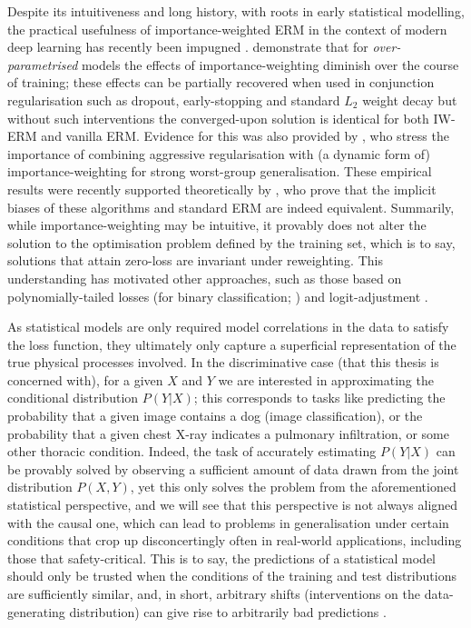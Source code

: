 Despite its intuitiveness and long history, with roots in early statistical modelling, the
practical usefulness of importance-weighted \ac{ERM} in the context of modern deep learning has recently
been impugned \citep{byrd2019effect, zhai2022understanding}.
%
\cite{byrd2019effect} demonstrate that for \emph{over-parametrised} models the effects of
importance-weighting diminish over the course of training; these effects can be partially recovered
when used in conjunction regularisation such as dropout, early-stopping and standard \(L_2\) weight
decay but without such interventions the converged-upon solution is identical for both
\ac{IW}-\ac{ERM} and
vanilla \ac{ERM}. 
%
Evidence for this was also provided by \cite{sagawa2019distributionally}, who stress the importance
of combining aggressive regularisation with (a dynamic form of) importance-weighting for strong
worst-group generalisation.
%
These empirical results were recently supported theoretically by \cite{zhai2022understanding}, who
prove that the implicit biases of these algorithms and standard \ac{ERM} are indeed equivalent.
%
Summarily, while importance-weighting may be intuitive, it provably does not alter the solution to
the optimisation problem defined by the training set, which is to say, solutions that attain
zero-loss are invariant under reweighting.
%
This understanding has motivated other approaches, such as those based on polynomially-tailed
losses (for binary classification; \cite{wang2021importance}) and logit-adjustment
\citep{menon2020long}.
%

As statistical models are only required model correlations in the data to satisfy the loss
function, they ultimately only capture a superficial representation of the true physical processes
involved.
%
In the discriminative case (that this thesis is concerned with), for a given \( X \) and \( Y \) we
are interested in approximating the conditional distribution \( P(Y|X) \); this  corresponds to
tasks like predicting the probability that a given image contains a dog (image classification), or
the probability that a given chest X-ray indicates a pulmonary infiltration, or some other thoracic
condition.
%
Indeed, the task of accurately estimating \( P(Y | X) \) can be provably solved by observing a
sufficient amount of \iid{} data drawn from the joint distribution \( P(X,Y) \), yet this only
solves the problem from the aforementioned statistical perspective, and we will see that this
perspective is not always aligned with the causal one, which can lead to problems in generalisation
under certain conditions that crop up disconcertingly often in real-world applications, including
those that safety-critical.
%
This is to say, the predictions of a statistical model should only be trusted when the conditions
of the training and test distributions are sufficiently similar, and, in short, arbitrary shifts
(interventions on the data-generating distribution) can give rise to arbitrarily bad predictions
\citep{pearl2009causality, scholkopf2012causal}.


